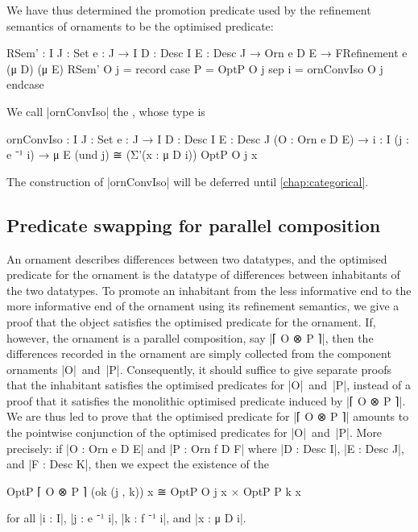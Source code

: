 We have thus determined the promotion predicate used by the refinement semantics of ornaments to be the optimised predicate:
\begin{code}
RSem' :  {I J : Set} {e : J → I} {D : Desc I} {E : Desc J} →
         Orn e D E → FRefinement e (μ D) (μ E)
RSem' O j = record  case  P  = OptP O j
                    sep   i  = ornConvIso O j endcase
\end{code}
We call |ornConvIso| the , whose type is
\begin{code}
ornConvIso :
  {I J : Set} {e : J → I} {D : Desc I} {E : Desc J} (O : Orn e D E) →
  {i : I} (j : e ⁻¹ i) → μ E (und j) ≅ (Σ'(x : μ D i)) OptP O j x
\end{code}
The construction of |ornConvIso| will be deferred until \autoref{chap:categorical}.

\subsection{Predicate swapping for parallel composition}
\label{sec:predicate-swapping}

An ornament describes differences between two datatypes, and the optimised predicate for the ornament is the datatype of differences between inhabitants of the two datatypes.
To promote an inhabitant from the less informative end to the more informative end of the ornament using its refinement semantics, we give a proof that the object satisfies the optimised predicate for the ornament.
If, however, the ornament is a parallel composition, say |⌈ O ⊗ P ⌉|, then the differences recorded in the ornament are simply collected from the component ornaments |O|~and~|P|.
Consequently, it should suffice to give separate proofs that the inhabitant satisfies the optimised predicates for |O|~and~|P|, instead of a proof that it satisfies the monolithic optimised predicate induced by |⌈ O ⊗ P ⌉|.
We are thus led to prove that the optimised predicate for |⌈ O ⊗ P ⌉| amounts to the pointwise conjunction of the optimised predicates for |O|~and~|P|.
More precisely: if |O : Orn e D E| and |P : Orn f D F| where |D : Desc I|, |E : Desc J|, and |F : Desc K|, then we expect the existence of the 
\begin{code}
OptP ⌈ O ⊗ P ⌉ (ok (j , k)) x ≅ OptP O j x × OptP P k x
\end{code}
for all |i : I|, |j : e ⁻¹ i|, |k : f ⁻¹ i|, and |x : μ D i|.

